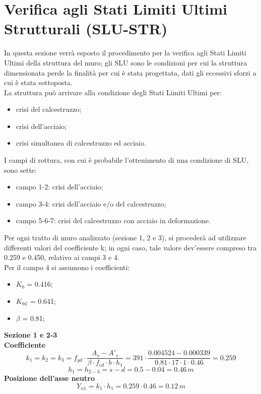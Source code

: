\section{Verifica agli Stati Limiti Ultimi Strutturali (SLU-STR)}
In questa sezione verrà esposto il procedimento per la verifica agli Stati Limiti Ultimi della struttura del muro; gli SLU sono le condizioni per cui la struttura dimensionata perde la finalità per cui è stata progettata, dati gli eccessivi sforzi a cui è stata sottoposta.\\
La struttura può arrivare alla condizione degli Stati Limiti Ultimi per:
\begin{itemize}
    \item crisi del calcestruzzo;
    \item crisi dell'acciaio;
    \item crisi simultanea di calcestruzzo ed acciaio.
\end{itemize}
I campi di rottura, con cui è probabile l'ottenimento di una condizione di SLU, sono sette:
\begin{itemize}
    \item campo 1-2: crisi dell'acciaio;
    \item campo 3-4: crisi dell'acciaio e/o del calcestruzzo;
    \item campo 5-6-7: crisi del calcestruzzo con acciaio in deformazione.
\end{itemize}
Per ogni tratto di muro analizzato (sezione 1, 2 e 3), si procederà ad utilizzare differenti valori del coefficiente k; in ogni caso, tale valore dev'essere compreso tra 0.259 e 0.450, relativo ai campi 3 e 4.\\
Per il campo 4 si assumono i coefficienti:
\begin{itemize}
    \item $K_b$ = 0.416;
    \item $K_{bil}$ = 0.641;
    \item $\beta$ = 0.81;
\end{itemize}
\textbf{Sezione 1 e 2-3}\\
\textbf{Coefficiente}
\begin{equation*}
    k_1 = k_2 = k_3 = f_{yd} \cdot \frac{A_s - A'_s}{\beta \cdot f_{cd} \cdot b \cdot h_1} = 391 \cdot \frac{0.004524 - 0.000339}{0.81 \cdot 17 \cdot 1 \cdot 0.46} = 0.259 
\end{equation*}
\begin{equation*}
    h_1 = h_{2-3} = s -d = 0.5 - 0.04 = 0.46 \,m
\end{equation*}
\textbf{Posizione dell'asse neutro}
\begin{equation*}
    Y_{n1} = k_1 \cdot h_1 = 0.259 \cdot 0.46 = 0.12 \,m
\end{equation*}

